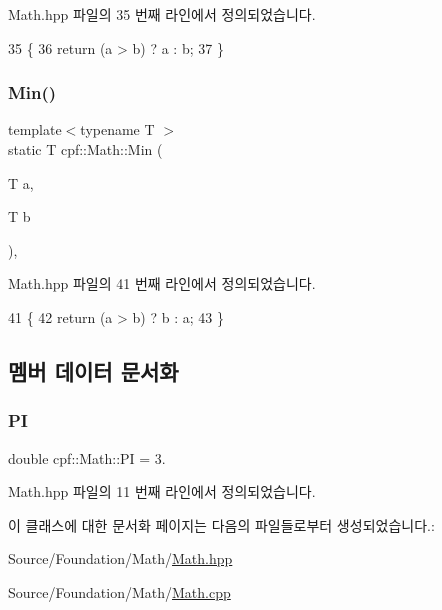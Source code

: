 Math.\+hpp 파일의 35 번째 라인에서 정의되었습니다.


\begin{DoxyCode}
35                                \{
36             \textcolor{keywordflow}{return} (a > b) ? a : b;
37         \}
\end{DoxyCode}
\mbox{\label{classcpf_1_1_math_a182737f1c3c7268808951fffb3287293}} 
\subsubsection{\texorpdfstring{Min()}{Min()}}
{\footnotesize\ttfamily template$<$typename T $>$ \\
static T cpf\+::\+Math\+::\+Min (\begin{DoxyParamCaption}\item[{T}]{a,  }\item[{T}]{b }\end{DoxyParamCaption})\hspace{0.3cm}{\ttfamily [inline]}, {\ttfamily [static]}}



Math.\+hpp 파일의 41 번째 라인에서 정의되었습니다.


\begin{DoxyCode}
41                                \{
42             \textcolor{keywordflow}{return} (a > b) ? b : a;
43         \}
\end{DoxyCode}


\subsection{멤버 데이터 문서화}
\mbox{\label{classcpf_1_1_math_ad004555e859d1018bd7778120cc83a78}} 
\subsubsection{\texorpdfstring{PI}{PI}}
{\footnotesize\ttfamily double cpf\+::\+Math\+::\+PI = 3.\hspace{0.3cm}{\ttfamily [static]}}



Math.\+hpp 파일의 11 번째 라인에서 정의되었습니다.



이 클래스에 대한 문서화 페이지는 다음의 파일들로부터 생성되었습니다.\+:\begin{DoxyCompactItemize}
\item 
Source/\+Foundation/\+Math/\hyperlink{_math_8hpp}{Math.\+hpp}\item 
Source/\+Foundation/\+Math/\hyperlink{_math_8cpp}{Math.\+cpp}\end{DoxyCompactItemize}
